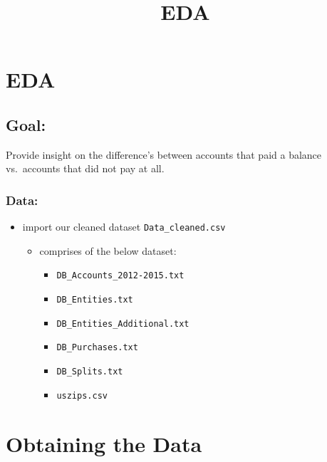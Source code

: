 \documentclass[11pt]{article}
\title{EDA}
\providecommand{\tightlist}{%
      \setlength{\itemsep}{0pt}\setlength{\parskip}{0pt}}
\begin{document}
    
    
    \maketitle
    
    

    
    \hypertarget{eda}{%
\section{EDA}\label{eda}}

    \hypertarget{goal}{%
\subsection{Goal:}\label{goal}}

Provide insight on the difference's between accounts that paid a balance
vs.~accounts that did not pay at all.

\hypertarget{data}{%
\subsubsection{Data:}\label{data}}

\begin{itemize}
\tightlist
\item
  import our cleaned dataset \texttt{Data\_cleaned.csv}

  \begin{itemize}
  \tightlist
  \item
    comprises of the below dataset:

    \begin{itemize}
    \tightlist
    \item
      \texttt{DB\_Accounts\_2012-2015.txt}
    \item
      \texttt{DB\_Entities.txt}
    \item
      \texttt{DB\_Entities\_Additional.txt}
    \item
      \texttt{DB\_Purchases.txt}
    \item
      \texttt{DB\_Splits.txt}
    \item
      \texttt{uszips.csv}
    \end{itemize}
  \end{itemize}
\end{itemize}

    \hypertarget{obtaining-the-data}{%
\section{Obtaining the Data}\label{obtaining-the-data}}
\end{document}

